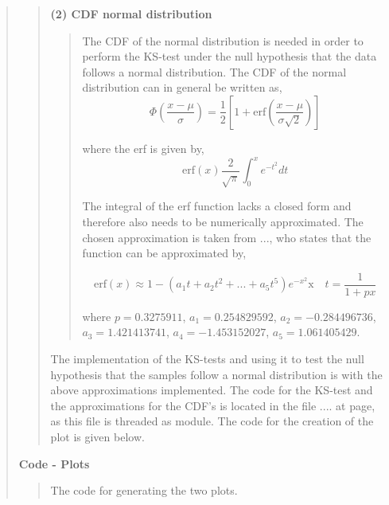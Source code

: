 \begin{quote}
\begin{quote}
\textbf{(2) CDF normal distribution}
\begin{quote}
The CDF of the normal distribution is needed in order to perform the KS-test under the null hypothesis that the data follows a normal distribution. The CDF of the normal distribution can in general be written as,
\begin{equation}
\Phi\left( \frac{x- \mu}{\sigma}\right) = \frac{1}{2} \left[ 1 + \text{erf} \left( \frac{x - \mu}{\sigma\sqrt{2}} \right) \right]
\end{equation}

where the erf is given by,
\begin{equation}
\text{erf}(x)  \frac{2}{\sqrt{\pi}} \int_0^{x} e^{-t^2} dt
\end{equation}

The integral of the erf function lacks a closed form and therefore also needs to be numerically approximated. The chosen approximation is taken from ..., who states that the function can be 
approximated by,

\begin{equation}
\text{erf}(x) \approx 1- (a_1t+a_2t^2 + ... + a_5t^5)e^{-x^2} \text{x} \quad t = \frac{1}{1+px}
\end{equation}

where $p  =0.3275911$, $a_1 =  0.254829592$, $a_2 = -0.284496736$, $a_3 = 1.421413741$, $a_4 =  -1.453152027$, $a_5 = 1.061405429$.
\end{quote}

The implementation of the KS-tests and using it to test the null hypothesis that the samples follow a normal distribution is with the above approximations implemented. The code for the KS-test and the approximations for the CDF's is located in the file .... at page, as this file is threaded as module. The code for the creation of the plot is given below.  
\end{quote}

\newpage
\textbf{Code - Plots}

\begin{quote}
The code for generating the two plots.

\end{quote}
\newpage


\end{quote}
